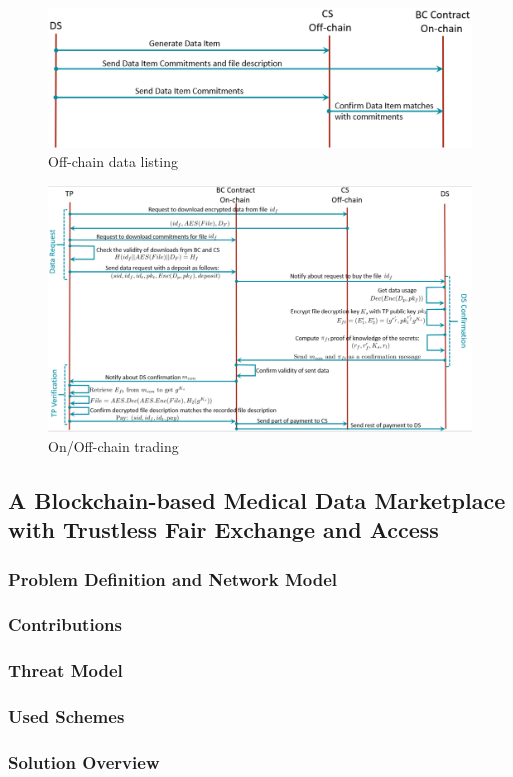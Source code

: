 \begin{figure}
\centering
  \includegraphics[width=1\linewidth]{imgs/22-sequenceDataListing.eps}
  \caption{Off-chain data listing}
  \label{fig:22-off-chain-data-listing}
\end{figure}

\begin{figure}
\centering
  \includegraphics[width=1\linewidth]{imgs/22-sequenceTrading.eps}
  \caption{On/Off-chain trading}
  \label{fig:22-off-chain-trading}
\end{figure}

\subsection{A Blockchain-based Medical Data Marketplace with Trustless Fair Exchange and Access~\cite{alsharif2020blockchain}}
\label{sec:blockchain-based-medical-data-marketplace-20}

\subsubsection{Problem Definition and Network Model}


\subsubsection{Contributions}


\subsubsection{Threat Model}

\subsubsection{Used Schemes}

\subsubsection{Solution Overview}
